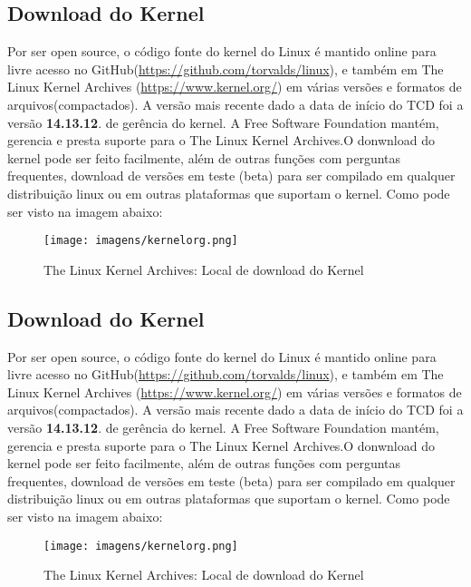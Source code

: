 \documentclass[12pt]{article}
\begin{document}
\subsection*{Download do Kernel}
Por ser open source, o código fonte do kernel do Linux é mantido online para livre acesso no GitHub(\url{https://github.com/torvalds/linux}), e também em The Linux Kernel Archives (\url{https://www.kernel.org/}) em várias versões e formatos de arquivos(compactados). A versão mais recente dado a data de início do TCD foi a versão \textbf{14.13.12}.
de gerência do kernel.
	A Free Software Foundation mantém, gerencia e presta suporte para o The Linux Kernel Archives.O donwnload do kernel pode ser feito facilmente, além de outras funções com perguntas frequentes, download de versões em teste (beta) para ser compilado em qualquer distribuição linux ou em outras plataformas que suportam o kernel.
	\vspace*{2cm}
	 Como pode ser visto na imagem abaixo:
\begin{figure}[!h]
	\centering
	\texttt{[image: imagens/kernelorg.png]}
	\caption{The Linux Kernel Archives: Local de download do Kernel}
	\label{kernelorg}
\end{figure}

\subsection*{Download do Kernel}
Por ser open source, o código fonte do kernel do Linux é mantido online para livre acesso no GitHub(\url{https://github.com/torvalds/linux}), e também em The Linux Kernel Archives (\url{https://www.kernel.org/}) em várias versões e formatos de arquivos(compactados). A versão mais recente dado a data de início do TCD foi a versão \textbf{14.13.12}.
de gerência do kernel.
	A Free Software Foundation mantém, gerencia e presta suporte para o The Linux Kernel Archives.O donwnload do kernel pode ser feito facilmente, além de outras funções com perguntas frequentes, download de versões em teste (beta) para ser compilado em qualquer distribuição linux ou em outras plataformas que suportam o kernel.
	\vspace*{2cm}
	 Como pode ser visto na imagem abaixo:
\begin{figure}[!h]
	\centering
	\texttt{[image: imagens/kernelorg.png]}
	\caption{The Linux Kernel Archives: Local de download do Kernel}
	\label{kernelorg}
\end{figure}
\end{document}
